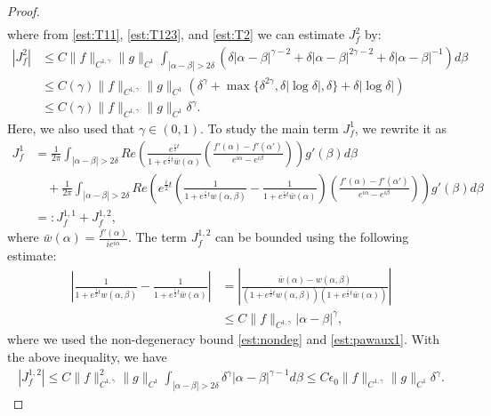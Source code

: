 \documentclass[11pt,reqno]{amsproc}
\newcommand{\eps}{\epsilon}
\begin{document}
\begin{proof}
\begin{align*}
    \end{align*}
    where from \eqref{est:T11}, \eqref{est:T123}, and \eqref{est:T2} we can estimate $J_f^2$ by:
    \begin{equation}
        \label{est:Jf2}
        \begin{aligned}
            |J_f^2| &\le C\|f\|_{C^{1,\gamma}}\|g\|_{C^1}\int_{|\alpha - \beta| > 2\delta} \left(\delta |\alpha - \beta|^{\gamma-2} + \delta |\alpha - \beta|^{2\gamma-2} + \delta |\alpha - \beta|^{-1}\right) d\beta\\
            &\le C(\gamma)\|f\|_{C^{1,\gamma}}\|g\|_{C^1}(\delta^\gamma + \max\{\delta^{2\gamma},\delta|\log\delta|, \delta\} + \delta |\log \delta|)\\
            &\le C(\gamma)\|f\|_{C^{1,\gamma}}\|g\|_{C^1}\delta^\gamma.
        \end{aligned}
    \end{equation}
    Here, we also used that $\gamma \in (0,1).$ To study the main term $J_f^1$, we rewrite it as
    \begin{align*}
        J_f^1 &= \frac{1}{2\pi}\int_{|\alpha - \beta| > 2\delta} Re\left(\frac{e^{\frac{i}{2}t}}{1+ e^{\frac{i}{2}t}\bar{w}(\alpha)}\left(\frac{f'(\alpha) - f'(\alpha')}{e^{i\alpha} - e^{i\beta}}\right)\right)g'(\beta) d\beta\\
        &\quad + \frac{1}{2\pi}\int_{|\alpha - \beta| > 2\delta} Re\left(e^{\frac{i}{2}t}\left(\frac{1}{1+ e^{\frac{i}{2}t}w(\alpha,\beta)} - \frac{1}{1+ e^{\frac{i}{2}t}\bar{w}(\alpha)}\right)\left(\frac{f'(\alpha) - f'(\alpha')}{e^{i\alpha} - e^{i\beta}}\right)\right)g'(\beta) d\beta\\
        &=: J_f^{1,1} + J_f^{1,2},
    \end{align*}
    where $\bar{w}(\alpha) = \frac{f'(\alpha)}{ie^{i\alpha}}$. The term $J_{f}^{1,2}$ can be bounded using the following estimate:
    \begin{align*}
        \left|\frac{1}{1+ e^{\frac{i}{2}t}w(\alpha,\beta)} - \frac{1}{1+ e^{\frac{i}{2}t}\bar{w}(\alpha)}\right| &= \left|\frac{\bar w(\alpha) - w(\alpha,\beta)}{(1+ e^{\frac{i}{2}t}w(\alpha,\beta))(1+ e^{\frac{i}{2}t}\bar{w}(\alpha))}\right|\\
        &\le C\|f\|_{C^{1,\gamma}} |\alpha - \beta|^\gamma,
    \end{align*}
    where we used the non-degeneracy bound \eqref{est:nondeg} and \eqref{est:pawaux1}. With the above inequality, we have
    \begin{align*}
        |J_f^{1,2}| \le C\|f\|_{C^{1,\gamma}}^2\|g\|_{C^1}\int_{|\alpha - \beta| > 2\delta} \delta^\gamma|\alpha - \beta|^{\gamma - 1} d\beta \le C\eps_0\|f\|_{C^{1,\gamma}}\|g\|_{C^1}\delta^\gamma.

\end{align*}
\end{proof}
\end{document}
